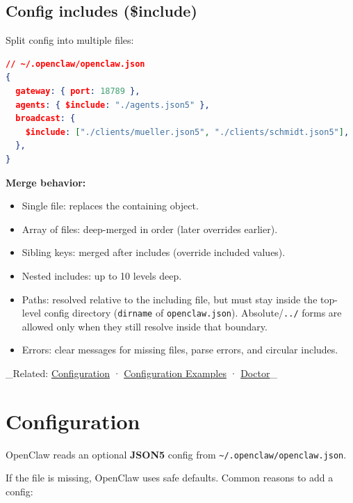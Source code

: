 \hrulefill


\subsection{Config includes (\$include)}


Split config into multiple files:

\begin{lstlisting}[language=json]
// ~/.openclaw/openclaw.json
{
  gateway: { port: 18789 },
  agents: { $include: "./agents.json5" },
  broadcast: {
    $include: ["./clients/mueller.json5", "./clients/schmidt.json5"],
  },
}
\end{lstlisting}


\textbf{Merge behavior:}

\begin{itemize}
  \item Single file: replaces the containing object.
  \item Array of files: deep-merged in order (later overrides earlier).
  \item Sibling keys: merged after includes (override included values).
  \item Nested includes: up to 10 levels deep.
  \item Paths: resolved relative to the including file, but must stay inside the top-level config directory (\texttt{dirname} of \texttt{openclaw.json}). Absolute/\texttt{../} forms are allowed only when they still resolve inside that boundary.
  \item Errors: clear messages for missing files, parse errors, and circular includes.
\end{itemize}


\hrulefill


\_Related: \href{/gateway/configuration}{Configuration} · \href{/gateway/configuration-examples}{Configuration Examples} · \href{/gateway/doctor}{Doctor}\_


\clearpage

\section{Configuration}


OpenClaw reads an optional \textbf{JSON5} config from \texttt{\textasciitilde{}/.openclaw/openclaw.json}.

If the file is missing, OpenClaw uses safe defaults. Common reasons to add a config:

